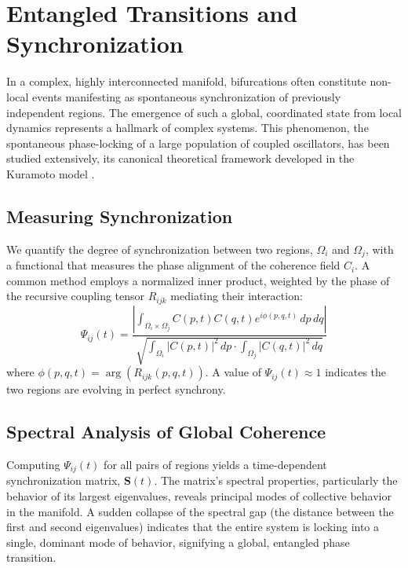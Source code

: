 \section{Entangled Transitions and Synchronization}

In a complex, highly interconnected manifold, bifurcations often constitute non-local events manifesting as spontaneous synchronization of previously independent regions. The emergence of such a global, coordinated state from local dynamics represents a hallmark of complex systems. This phenomenon, the spontaneous phase-locking of a large population of coupled oscillators, has been studied extensively, its canonical theoretical framework developed in the Kuramoto model \autocite{Kuramoto1975}.

\subsection{Measuring Synchronization}

We quantify the degree of synchronization between two regions, \(\Omega_i\) and \(\Omega_j\), with a functional that measures the phase alignment of the coherence field \(C_i\). A common method employs a normalized inner product, weighted by the phase of the recursive coupling tensor \(R_{ijk}\) mediating their interaction:
\begin{equation}
\Psi_{ij}(t) = \frac{\left|\int_{\Omega_i \times \Omega_j} C(p,t)C(q,t)e^{i\phi(p,q,t)} \, dp \, dq\right|}{\sqrt{\int_{\Omega_i} |C(p,t)|^2 \, dp \cdot \int_{\Omega_j} |C(q,t)|^2 \, dq}}
\end{equation}
where \(\phi(p,q,t) = \arg(R_{ijk}(p,q,t))\). A value of \(\Psi_{ij}(t) \approx 1\) indicates the two regions are evolving in perfect synchrony.

\subsection{Spectral Analysis of Global Coherence}

Computing \(\Psi_{ij}(t)\) for all pairs of regions yields a time-dependent synchronization matrix, \(\mathbf{S}(t)\). The matrix's spectral properties, particularly the behavior of its largest eigenvalues, reveals principal modes of collective behavior in the manifold. A sudden collapse of the spectral gap (the distance between the first and second eigenvalues) indicates that the entire system is locking into a single, dominant mode of behavior, signifying a global, entangled phase transition. 